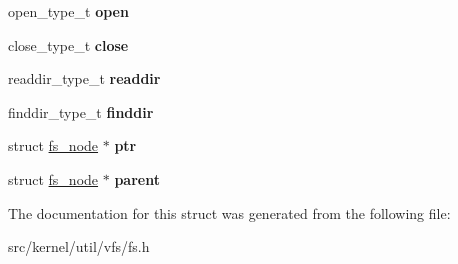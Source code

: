 \begin{DoxyCompactItemize}
\item 
\mbox{\label{structfs__node_ae308735a682047db3d44fad8dd060ca7}} 
open\+\_\+type\+\_\+t {\bfseries open}
\item 
\mbox{\label{structfs__node_af1ac58764b3d9ca7b94c9ec25520032f}} 
close\+\_\+type\+\_\+t {\bfseries close}
\item 
\mbox{\label{structfs__node_ae2ecf9ea0c27bed7800788d68747a6c6}} 
readdir\+\_\+type\+\_\+t {\bfseries readdir}
\item 
\mbox{\label{structfs__node_ad001a3cb2ef6d5fda76bd76b7b0cb641}} 
finddir\+\_\+type\+\_\+t {\bfseries finddir}
\item 
\mbox{\label{structfs__node_a2d776aaadaba8d23b7f28a21aa871cbf}} 
struct \hyperlink{structfs__node}{fs\+\_\+node} $\ast$ {\bfseries ptr}
\item 
\mbox{\label{structfs__node_abe910c8cdb3c1b01c89be007319be0df}} 
struct \hyperlink{structfs__node}{fs\+\_\+node} $\ast$ {\bfseries parent}
\end{DoxyCompactItemize}


The documentation for this struct was generated from the following file\+:\begin{DoxyCompactItemize}
\item 
src/kernel/util/vfs/fs.\+h\end{DoxyCompactItemize}
